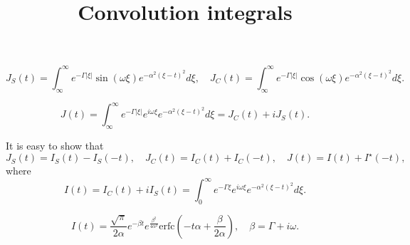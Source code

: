 \documentclass[preprint,aps,showpacs]{revtex4}
\begin{document}
\title{Convolution integrals}
\begin{equation}
 J_S(t) = \int_{\infty}^{\infty}e^{-\Gamma|\xi|}\sin{(\omega\xi)}e^{-\alpha^2(\xi-t)^2}d\xi,\quad
 J_C(t) = \int_{\infty}^{\infty}e^{-\Gamma|\xi|}\cos{(\omega\xi)}e^{-\alpha^2(\xi-t)^2}d\xi.
\end{equation}

\begin{equation}
 J(t) = \int_{\infty}^{\infty}e^{-\Gamma|\xi|}e^{i\omega\xi}e^{-\alpha^2(\xi-t)^2}d\xi = J_C(t)+iJ_S(t).
\end{equation}

It is easy to show that
\begin{equation}
 J_S(t) = I_S(t)-I_S(-t),\quad J_C(t) = I_C(t)+I_C(-t),\quad J(t) = I(t)+I^{\star}(-t),
\end{equation}
where
\begin{equation}\label{eq:int_I}
 I(t) = I_C(t)+iI_S(t) = \int_{0}^{\infty}e^{-\Gamma\xi}e^{i\omega\xi}e^{-\alpha^2(\xi-t)^2}d\xi.
\end{equation}

\begin{equation}
 I(t) = \frac{\sqrt{\pi}}{2\alpha}e^{-\beta t}e^{\frac{\beta^2}{4\alpha^2}}\text{erfc}\left(-t\alpha+\frac{\beta}{2\alpha}\right),\quad \beta = \Gamma + i\omega.
\end{equation}
 
\end{document}

